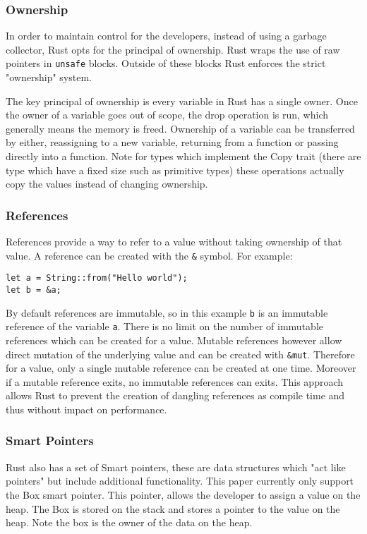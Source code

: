 \documentclass[ oneside,%
                    author={James Elgar},
                    degree={MEng},
                     title={Bidirectional transformer between functional and \\ object-oriented programming in Rust},
                  subtitle={}]{dissertation}
\newcommand{\rust}[1]{\texttt{#1}}
\begin{document}
\subsubsection{Ownership}

In order to maintain control for the developers, instead of using a garbage collector, Rust opts for the principal of ownership. Rust wraps the use of raw pointers in \rust{unsafe} blocks. Outside of these blocks Rust enforces the strict "ownership" system.

The key principal of ownership is every variable in Rust has a single owner. Once the owner of a variable goes out of scope, the drop operation is run, which generally means the memory is freed. Ownership of a variable can be transferred by either, reassigning to a new variable, returning from a function or passing directly into a function. Note for types which implement the Copy trait (there are type which have a fixed size such as primitive types) these operations actually copy the values instead of changing ownership.

\subsubsection{References}

References provide a way to refer to a value without taking ownership of that value. A reference can be created with the \rust{&} symbol. For example:

\begin{verbatim}
let a = String::from("Hello world");
let b = &a;
\end{verbatim}

By default references are immutable, so in this example \rust{b} is an immutable reference of the variable \rust{a}.
There is no limit on the number of immutable references which can be created for a value. Mutable references however allow direct mutation of the underlying value and can be created with \rust{&mut}. Therefore for a value, only a single mutable reference can be created at one time. Moreover if a mutable reference exits, no immutable references can exits. This approach allows Rust to prevent the creation of dangling references as compile time and thus without impact on performance.

\subsubsection{Smart Pointers}

Rust also has a set of Smart pointers, these are data structures which "act like pointers" but include additional functionality. This paper currently only support the Box smart pointer. This pointer, allows the developer to assign a value on the heap. The Box is stored on the stack and stores a pointer to the value on the heap. Note the box is the owner of the data on the heap.
\end{document}
